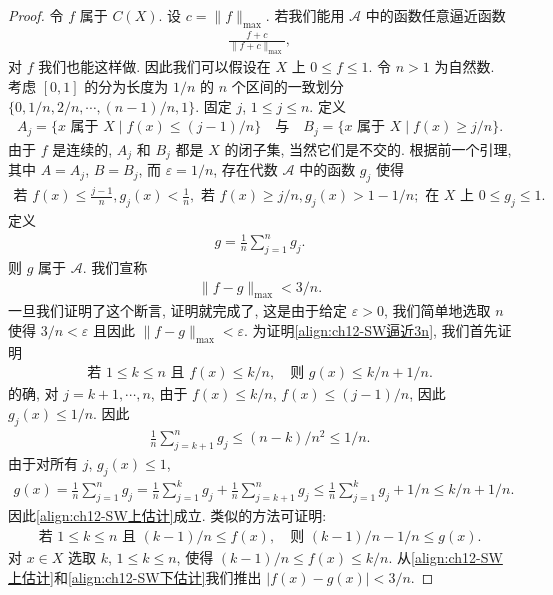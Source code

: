 \documentclass[../../main.tex]{subfiles}
\begin{document}
\begin{proof}
令 $f$ 属于 $C(X)$. 设 $c=\|f\|_{\max}$. 若我们能用 $\mathcal{A}$ 中的函数任意逼近函数
\begin{align*}
\frac{f+c}{\|f+c\|_{\max}},
\end{align*}
对 $f$ 我们也能这样做. 因此我们可以假设在 $X$ 上 $0\leqslant f\leqslant 1$. 令 $n>1$ 为自然数. 考虑 $[0,1]$ 的分为长度为 $1/n$ 的 $n$ 个区间的一致划分 $\{0,1/n,2/n,\cdots,(n-1)/n,1\}$. 固定 $j$, $1\leqslant j\leqslant n$. 定义
\begin{align*}
A_{j}=\{x\text{ 属于 }X\mid f(x)\leqslant(j-1)/n\}\quad\text{与}\quad B_{j}=\{x\text{ 属于 }X\mid f(x)\geqslant j/n\}.
\end{align*}
由于 $f$ 是连续的, $A_{j}$ 和 $B_{j}$ 都是 $X$ 的闭子集, 当然它们是不交的. 根据前一个引理, 其中 $A=A_{j}$, $B=B_{j}$, 而 $\varepsilon=1/n$, 存在代数 $\mathcal{A}$ 中的函数 $g_{j}$ 使得
\begin{align}
\text{若 }f(x)\leqslant\frac{j-1}{n},g_{j}(x)<\frac{1}{n},\text{ 若 }f(x)\geqslant j/n,g_{j}(x)>1-1/n;\text{ 在 }X\text{ 上 }0\leqslant g_{j}\leqslant 1.\label{align:ch12-SWgj}
\end{align}
定义
\begin{align*}
g=\frac{1}{n}\sum_{j=1}^{n}g_{j}.
\end{align*}
则 $g$ 属于 $\mathcal{A}$. 我们宣称
\begin{align}
\|f-g\|_{\max}<3/n.\label{align:ch12-SW逼近3n}
\end{align}
一旦我们证明了这个断言, 证明就完成了, 这是由于给定 $\varepsilon>0$, 我们简单地选取 $n$ 使得 $3/n<\varepsilon$ 且因此 $\|f-g\|_{\max}<\varepsilon$. 为证明\eqref{align:ch12-SW逼近3n}, 我们首先证明
\begin{align}
\text{若 }1\leqslant k\leqslant n\text{ 且 }f(x)\leqslant k/n,\quad\text{则 }g(x)\leqslant k/n+1/n.\label{align:ch12-SW上估计}
\end{align}
的确, 对 $j=k+1,\cdots,n$, 由于 $f(x)\leqslant k/n$, $f(x)\leqslant(j-1)/n$, 因此 $g_{j}(x)\leqslant 1/n$. 因此
\begin{align*}
\frac{1}{n}\sum_{j=k+1}^{n}g_{j}\leqslant(n-k)/n^{2}\leqslant 1/n.
\end{align*}
由于对所有 $j$, $g_{j}(x)\leqslant 1$,
\begin{align*}
g(x)=\frac{1}{n}\sum_{j=1}^{n}g_{j}=\frac{1}{n}\sum_{j=1}^{k}g_{j}+\frac{1}{n}\sum_{j=k+1}^{n}g_{j}\leqslant\frac{1}{n}\sum_{j=1}^{k}g_{j}+1/n\leqslant k/n+1/n.
\end{align*}
因此\eqref{align:ch12-SW上估计}成立. 类似的方法可证明:
\begin{align}
\text{若 }1\leqslant k\leqslant n\text{ 且 }(k-1)/n\leqslant f(x),\quad\text{则 }(k-1)/n-1/n\leqslant g(x).\label{align:ch12-SW下估计}
\end{align}
对 $x\in X$ 选取 $k$, $1\leqslant k\leqslant n$, 使得 $(k-1)/n\leqslant f(x)\leqslant k/n$. 从\eqref{align:ch12-SW上估计}和\eqref{align:ch12-SW下估计}我们推出 $|f(x)-g(x)|<3/n$.
\end{proof}
\end{document}
